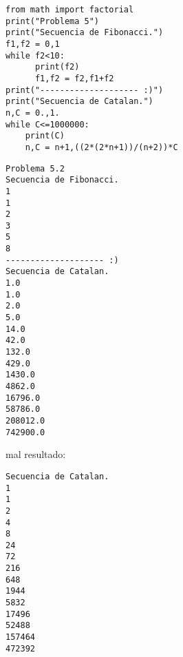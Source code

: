 \documentclass[12pt]{article}
\begin{document}
\pagebreak
\begin{verbatim}
from math import factorial
print("Problema 5")
print("Secuencia de Fibonacci.")
f1,f2 = 0,1
while f2<10:
      print(f2)
      f1,f2 = f2,f1+f2   
print("-------------------- :)")
print("Secuencia de Catalan.")
n,C = 0.,1.
while C<=1000000:
    print(C) 
    n,C = n+1,((2*(2*n+1))/(n+2))*C
\end{verbatim}
\begin{verbatim}
Problema 5.2
Secuencia de Fibonacci.
1
1
2
3
5
8
-------------------- :)
Secuencia de Catalan.
1.0
1.0
2.0
5.0
14.0
42.0
132.0
429.0
1430.0
4862.0
16796.0
58786.0
208012.0
742900.0
\end{verbatim}
mal resultado:
\begin{verbatim}
Secuencia de Catalan.
1
1
2
4
8
24
72
216
648
1944
5832
17496
52488
157464
472392
\end{verbatim}
\end{document}
